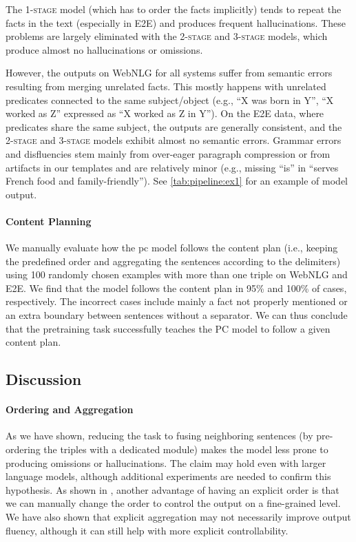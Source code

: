The \textsc{1-stage} model (which has to order the facts implicitly) tends to repeat the facts in the text (especially in E2E) and produces frequent hallucinations. These problems are largely eliminated with the \textsc{2-stage} and \textsc{3-stage} models, which produce almost no hallucinations or omissions.

However, the outputs on WebNLG for all systems suffer from semantic errors resulting from merging unrelated facts. This mostly happens with unrelated predicates connected to the same subject/object (e.g., ``X was born in Y'', ``X worked as Z'' expressed as ``X worked as Z in Y''). On the E2E data, where predicates share the same subject, the outputs are generally consistent, and the \textsc{2-stage} and \textsc{3-stage} models exhibit almost no semantic errors. Grammar errors and disfluencies stem mainly from over-eager paragraph compression or from artifacts in our templates and are relatively minor (e.g., missing ``is'' in ``serves French food and family-friendly''). See \autoref{tab:pipeline:ex1} for an example of model output.


\paragraph{Content Planning} We manually evaluate how the \ac{pc} model follows the content plan (i.e., keeping the predefined order and aggregating the sentences according to the delimiters) using 100 randomly chosen examples with more than one triple on WebNLG and E2E. We find that the model follows the content plan in 95\% and 100\% of cases, respectively. The incorrect cases include mainly a fact not properly mentioned or an extra boundary between sentences without a separator. We can thus conclude that the pretraining task successfully teaches the PC model to follow a given content plan.

\subsection{Discussion}
\label{sec:pipeline:discussion}
\paragraph{Ordering and Aggregation} As we have shown, reducing the task to fusing neighboring sentences (by pre-ordering the triples with a dedicated module) makes the model less prone to producing omissions or hallucinations. The claim may hold even with larger language models, although additional experiments are needed to confirm this hypothesis. As shown in \citet{su2021plan}, another advantage of having an explicit order is that we can manually change the order to control the output on a fine-grained level. We have also shown that explicit aggregation may not necessarily improve output fluency, although it can still help with more explicit controllability.


